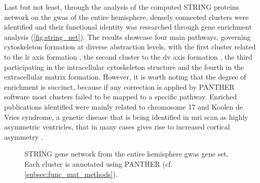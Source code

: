 Last but not least, through the analysis of the computed STRING proteins network on the \ac{gwas} of the entire hemisphere, densely connected clusters were identified and their functional identity was researched through gene enrichment analysis (\autoref{fig:string_net}). The results showcase four main pathways, governing cytoskeleton formation at diverse abstraction levels, with the first cluster related to the \ac{lr} axis formation \cite{Hu2017}, the second cluster to the \ac{dv} axis formation \cite{Hikasa2013}, the third participating in the intracellular cytoskeleton structure and the fourth in the extracellular matrix formation. However, it is worth noting that the degree of enrichment is succinct, because if any correction is applied by PANTHER software most clusters failed to be mapped to a specific pathway. Enriched publications identified were mainly related to chromosome 17 and Koolen de Vries syndrome, a genetic disease that is being identified in \ac{mri} scan as highly asymmetric ventricles, that in many cases gives rise to increased cortical asymmetry \cite{Myers2017}.

\begin{figure}[H]
\begin{adjustwidth}{-3cm}{-3cm}
	\begin{minipage}{0.5\linewidth}
		\centering
		
	\end{minipage} \quad
	\begin{minipage}{0.5\linewidth}
		\subfloat[Cluster 1, 13 genes participating in Hedhegog gene signalling (Reactome GO enrichment through Panther without correction, with Fisher's exact test, P-value=1e-2).]{
			
		}
	\quad
	\subfloat[Cluster 2, 8 genes participating in WNT ligand biogenesis, to regulate morphogenesis, namely the positioning of different cell types in a tissue during development (P-value={9e-3}).]{
		
	}
	\par\medskip
	\subfloat[Cluster 3, 8 genes with a role in gap junction assembly(P-value=1e-10), activation of AMPK downstream of NMDARs (P-value=4e-13) and tubulin folding(P-value=2e-10).]{
	
	}
	\quad
	\subfloat[Cluster 4, 5 genes participating in extracellular matrix organization, specifically in collagen formation (P-value=2e-4), but also in its degradation (P-value=1e-4).]{
	
	}
	\end{minipage}

\caption{STRING gene network from the entire hemisphere \ac{gwas} gene set. Each cluster is annotated using PANTHER (cf. \autoref{subsec:func_mat_methods}).}
\label{fig:string_net}
\end{adjustwidth}
\end{figure}



